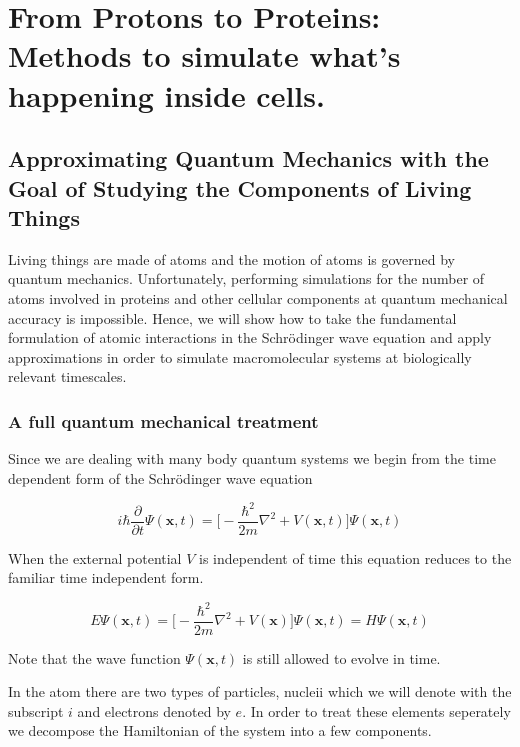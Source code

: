 \chapter{From Protons to Proteins: Methods to simulate what's happening inside cells.}
\label{chap:methods}

\section{Approximating Quantum Mechanics with the Goal of Studying the Components of Living Things}
Living things are made of atoms and the motion of atoms is governed by quantum mechanics. Unfortunately, performing simulations for the number of atoms involved in proteins and other cellular components at quantum mechanical accuracy is impossible. Hence, we will show how to take the fundamental formulation of atomic interactions in the Schr\"{o}dinger wave equation and apply approximations in order to simulate macromolecular systems at biologically relevant timescales. 

\subsection{A full quantum mechanical treatment}
Since we are dealing with many body quantum systems we begin from the time dependent form of the Schr\"{o}dinger wave equation 

\begin{equation}
i\hbar \frac {\partial}{\partial t} \Psi (\textbf{x},t) = \big[ -\frac{\hbar ^2}{2m}\nabla^2 + V (\textbf{x}, t) \big] \Psi (\textbf{x},t) 
\end{equation}

When the external potential $V$ is independent of time this equation reduces to the familiar time independent form. 

\begin{equation}
	E \Psi (\textbf{x}, t) = \big[ -\frac{\hbar ^2}{2m}\nabla^2 + V (\textbf{x}) \big] \Psi (\textbf{x}, t) = H \Psi(\textbf{x}, t) 
 \end{equation}

Note that the wave function $\Psi (\textbf {x}, t)$ is still allowed to evolve in time. 

In the atom there are two types of particles, nucleii which we will denote with the subscript $i$ and electrons denoted by $e$. In order to treat these elements seperately we decompose the Hamiltonian of the system into a few components. 

